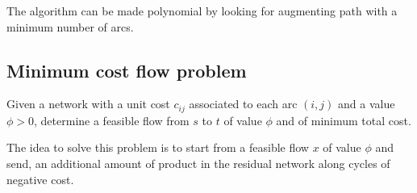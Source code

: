 \documentclass[12pt, a4paper]{report}
\newtheorem[style=M,bodystyle=\normalfont]{proposition}{Proposition}
\newtheorem[style=M,bodystyle=\normalfont]{theorem}{Theorem}
\newtheorem[style=M,bodystyle=\normalfont]{corollary}{Corollary}
\newtheorem[style=M,bodystyle=\normalfont]{lemma}{Lemma}
\newtheorem[style=M,bodystyle=\normalfont]{definition}{Definition}
\begin{document}
    The algorithm can be made polynomial by looking for augmenting path with a minimum number of arcs. 

    \subsection{Minimum cost flow problem}
    Given a network with a unit cost $c_{ij}$ associated to each arc $(i,j)$ and a value $\phi > 0$, determine a feasible flow from $s$ 
    to $t$ of value $\phi$ and of minimum total cost. 

    The idea to solve this problem is to start from a feasible flow $x$ of value $\phi$ and send, an additional amount of product in the
    residual network along cycles of negative cost. 

    
\end{document}
